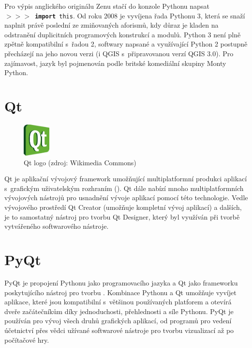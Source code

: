 Pro výpis anglického originálu Zenu stačí do konzole Pythonu napsat \\
\texttt{$>>>$~\textbf{import}~this}. Od roku 2008 je vyvíjena řada
Pythonu 3, která se snaží naplnit právě poslední ze zmiňovaných
aforismů, kdy důraz je kladen na odstranění duplicitních programových
konstrukcí a modulů. Python 3 není plně zpětně kompatibilní s~řadou 2,
softwary napsané a využívající Python 2 postupně přecházejí na jeho
novou verzi (i QGIS s~připravovanou verzí QGIS 3.0). Pro zajímavost,
jazyk byl pojmenován podle britské komediální skupiny Monty
Python. \cite{pythonHistory}

\section{Qt}

\begin{figure}[H] \centering
      \includegraphics[width=40pt]{./pictures/qt.png}
      \caption[Qt logo]{Qt logo (zdroj: Wikimedia Commons)}
      \label{fig:python}
\end{figure}

Qt je aplikační vývojový framework umožňující multiplatformní produkci
aplikací s~grafickým uživatelským rozhraním (). Qt dále nabízí
mnoho multiplatformních vývojových nástrojů pro usnadnění vývoje
aplikací pomocí této technologie. Vedle vývojového prostředí Qt
Creator (umožňuje kompletní vývoj aplikací) a dalších, je to
samostatný nástroj pro tvorbu  Qt Designer, který byl využíván
při tvorbě vytvářeného softwarového nástroje. \cite{qt}

\section{PyQt} PyQt je propojení Pythonu jako programovacího jazyka a
Qt jako frameworku poskytujícího nástroj pro tvorbu
. Kombinace Pythonu a Qt umožňuje vyvíjet aplikace, které jsou
kompatibilní s~většinou používaných platforem a otevírá dveře
začátečníkům díky jednoduchosti, přehlednosti a síle Pythonu. PyQt je
používán pro vývoj všech druhů grafických aplikací, od programů pro
vedení účetnictví přes vědci užívané softwarové nástroje pro tvorbu
vizualizací až po počítačové hry. \cite{rapidPyQt}

